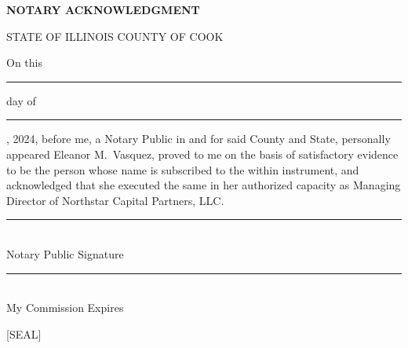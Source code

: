 \begin{minipage}[t]{0.48\textwidth}
  \begin{tcolorbox}[
    colback=white,
    colframe=accent!25,
    sharp corners,
    boxrule=0.4pt,
    left=10pt,
    right=10pt,
    top=10pt,
    bottom=10pt,
  ]
    {\footnotesize\bfseries\color{accent}NOTARY ACKNOWLEDGMENT}

    \smallskip
    {\footnotesize STATE OF ILLINOIS \hfill COUNTY OF COOK}

    \smallskip
    {\scriptsize On this \rule{1cm}{0.2pt} day of \rule{1.5cm}{0.2pt}, 2024, before me, a Notary Public in and for said County and State, personally appeared Eleanor M.\ Vasquez, proved to me on the basis of satisfactory evidence to be the person whose name is subscribed to the within instrument, and acknowledged that she executed the same in her authorized capacity as Managing Director of Northstar Capital Partners, LLC.}

    \vspace{1.5em}
    \noindent\rule{0.7\linewidth}{0.3pt}\\[4pt]
    {\footnotesize\color{medium}Notary Public Signature}\\[1em]

    \noindent\rule{0.7\linewidth}{0.3pt}\\[4pt]
    {\footnotesize\color{medium}My Commission Expires}

    \vspace{0.5em}
    {\tiny [SEAL]}
  \end{tcolorbox}
\end{minipage}

\newpage
